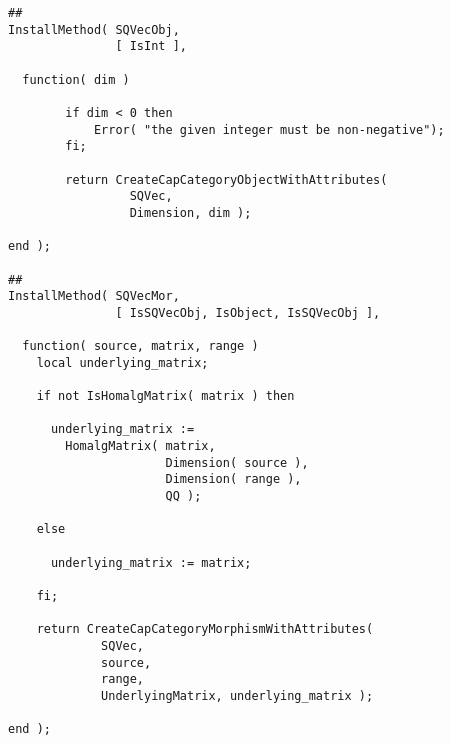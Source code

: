 \begin{small}
\begin{Verbatim}[frame=single]
##
InstallMethod( SQVecObj,
               [ IsInt ],
               
  function( dim )
        
        if dim < 0 then
            Error( "the given integer must be non-negative");
        fi;
        
        return CreateCapCategoryObjectWithAttributes(
                 SQVec,
                 Dimension, dim );
         
end );

##
InstallMethod( SQVecMor,
               [ IsSQVecObj, IsObject, IsSQVecObj ],
                  
  function( source, matrix, range )
    local underlying_matrix;

    if not IsHomalgMatrix( matrix ) then
    
      underlying_matrix := 
        HomalgMatrix( matrix,
                      Dimension( source ),
                      Dimension( range ),
                      QQ );

    else

      underlying_matrix := matrix;

    fi;
    
    return CreateCapCategoryMorphismWithAttributes(
             SQVec,
             source,
             range,
             UnderlyingMatrix, underlying_matrix );
    
end );
\end{Verbatim}
\end{small}